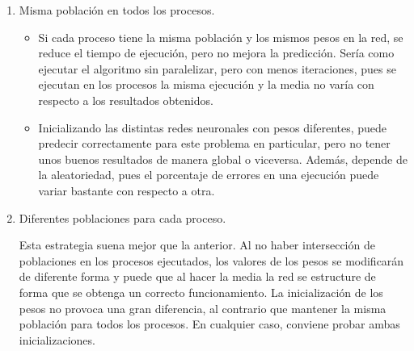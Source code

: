 	\begin{enumerate}
		\item Misma población en todos los procesos. 
		
		\begin{itemize}
			\item Si cada proceso tiene la misma población y los mismos pesos en la red, se reduce el tiempo de ejecución, pero no mejora la predicción. Sería como ejecutar el algoritmo sin paralelizar, pero con menos iteraciones, pues se ejecutan en los procesos la misma ejecución y la media no varía con respecto a los resultados obtenidos.
			\item Inicializando las distintas redes neuronales con pesos diferentes, puede predecir correctamente para este problema en particular, pero no tener unos buenos resultados de manera global o viceversa. Además, depende de la aleatoriedad, pues el porcentaje de errores en una ejecución puede variar bastante con respecto a otra. 
		\end{itemize} 
		
		\item Diferentes poblaciones para cada proceso. 
		
		Esta estrategia suena mejor que la anterior. Al no haber intersección de poblaciones en los procesos ejecutados, los valores de los pesos se modificarán de diferente forma y puede que al hacer la media la red se estructure de forma que se obtenga un correcto funcionamiento. La inicialización de los pesos no provoca una gran diferencia, al contrario que mantener la misma población para todos los procesos. En cualquier caso, conviene probar ambas inicializaciones.	
		
		
	\end{enumerate}	
	
	

	